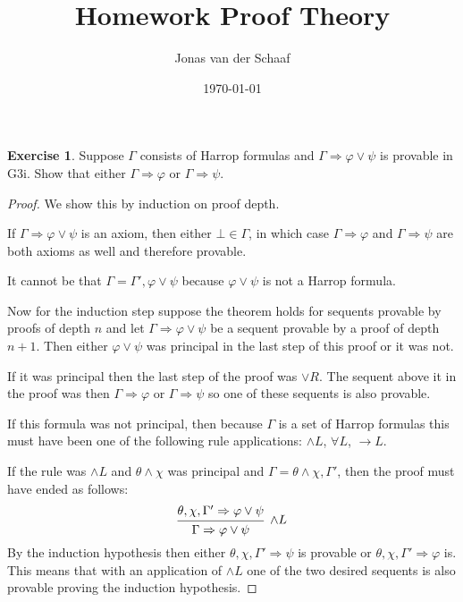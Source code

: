\documentclass{article}
\title{Homework Proof Theory}
\author{Jonas van der Schaaf}
\date{\today}
\newcommand{\sequent}[2]{#1\Rightarrow#2}
\theoremstyle{definition}
\newtheorem{question}{Exercise}
\begin{document}
\maketitle

\begin{question}
    Suppose \(\Gamma\) consists of Harrop formulas and
    \(\sequent{\Gamma}{\varphi\vee\psi}\) is provable in G3i. Show that either
    \(\sequent{\Gamma}{\varphi}\) or \(\sequent{\Gamma}{\psi}\).

    \begin{proof}
        We show this by induction on proof depth.

        If \(\sequent{\Gamma}{\varphi\vee\psi}\) is an axiom, then either
        \(\bot\in\Gamma\), in which case \(\sequent{\Gamma}{\varphi}\) and
        \(\sequent{\Gamma}{\psi}\) are both axioms as well and therefore
        provable.

        It cannot be that \(\Gamma=\Gamma',\varphi\vee\psi\) because
        \(\varphi\vee\psi\) is not a Harrop formula.

        Now for the induction step suppose the theorem holds for sequents
        provable by proofs of depth \(n\) and let
        \(\sequent{\Gamma}{\varphi\vee\psi}\) be a sequent provable by a proof
        of depth \(n+1\). Then either \(\varphi\vee\psi\) was principal in the
        last step of this proof or it was not.

        If it was principal then the last step of the proof was \(\vee R\). The
        sequent above it in the proof was then \(\sequent{\Gamma}{\varphi}\) or
        \(\sequent{\Gamma}{\psi}\) so one of these sequents is also provable.

        If this formula was not principal, then because \(\Gamma\) is a set of
        Harrop formulas this must have been one of the following rule
        applications: \(\wedge L\), \(\forall L\), \(\to L\).

        If the rule was \(\wedge L\) and \(\theta\wedge\chi\) was principal and
        \(\Gamma=\theta\wedge\chi,\Gamma'\), then the proof must have ended as
        follows:
        \[
            \begin{prooftree}
                \hypo{\sequent{\theta,\chi,\Gamma'}{\varphi\vee\psi}}
                \infer1[\(\wedge L\)]{\sequent{\Gamma}{\varphi\vee\psi}}
            \end{prooftree}
        \]
        By the induction hypothesis then either
        \(\sequent{\theta,\chi,\Gamma'}{\psi}\) is provable or
        \(\sequent{\theta,\chi,\Gamma'}{\varphi}\) is. This means that with an
        application of \(\wedge L\) one of the two desired sequents is also
        provable proving the induction hypothesis.


\end{proof}
\end{question}
\end{document}

